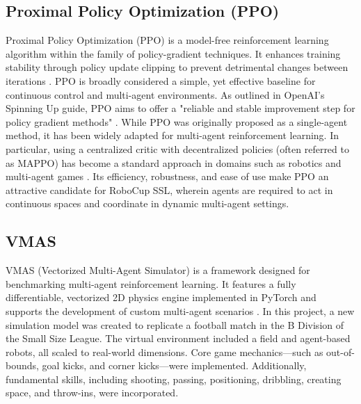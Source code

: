 \subsection{Proximal Policy Optimization (PPO)}
Proximal Policy Optimization (PPO) is a model-free reinforcement learning algorithm within the family of policy-gradient techniques. 
It enhances training stability through policy update clipping to prevent detrimental changes between iterations \cite{Schulman2017PPO}. 
PPO is broadly considered a simple, yet effective baseline for continuous control and multi-agent environments. 
As outlined in OpenAI's Spinning Up guide, PPO aims to offer a "reliable and stable improvement step for policy gradient methods" \cite{OpenAISpinningUp}. 
While PPO was originally proposed as a single-agent method, it has been widely adapted for multi-agent reinforcement learning. 
In particular, using a centralized critic with decentralized policies (often referred to as MAPPO) has become a standard approach in domains such as robotics and multi-agent games \cite{Yu2021MAPPO}. 
Its efficiency, robustness, and ease of use make PPO an attractive candidate for RoboCup SSL, wherein agents are required to act in continuous spaces and coordinate in dynamic multi-agent settings.

\subsection{VMAS}
VMAS (Vectorized Multi-Agent Simulator) is a framework designed for benchmarking multi-agent reinforcement learning. It features a fully differentiable, vectorized 2D physics engine implemented in PyTorch and supports the development of custom multi-agent scenarios \cite{bettini2022vmas}. In this project, a new simulation model was created to replicate a football match in the B Division of the Small Size League. The virtual environment included a field and agent-based robots, all scaled to real-world dimensions. Core game mechanics—such as out-of-bounds, goal kicks, and corner kicks—were implemented. Additionally, fundamental skills, including shooting, passing, positioning, dribbling, creating space, and throw-ins, were incorporated.

